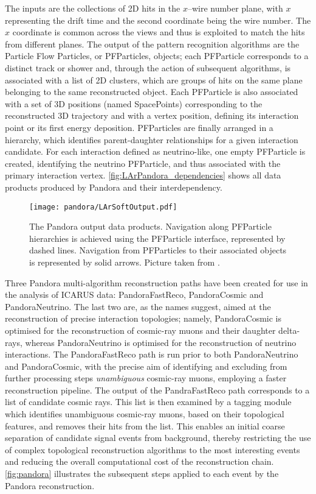 The inputs are the collections of 2D hits in the $x$--wire number plane, with $x$ representing the drift time and the second coordinate being the wire number. The $x$ coordinate is common across the views and thus is exploited to match the hits from different planes. The output of the pattern recognition algorithms are the Particle Flow Particles, or PFParticles, objects; each PFParticle corresponds to a distinct track or shower and, through the action of subsequent algorithms, is associated with a list of 2D clusters, which are groups of hits on the same plane belonging to the same reconstructed object. Each PFParticle is also associated with a set of 3D positions (named SpacePoints) corresponding to the reconstructed 3D trajectory and with a vertex position, defining its interaction point or its first energy deposition. PFParticles are finally arranged in a hierarchy, which identifies parent-daughter relationships for a given interaction candidate. For each interaction defined as neutrino-like, one empty PFParticle is created, identifying the neutrino PFParticle, and thus associated with the primary interaction vertex. \autoref{fig:LArPandora_dependencies} shows all data products produced by Pandora and their interdependency. 

\begin{figure}
    \centering
    \texttt{[image: pandora/LArSoftOutput.pdf]}
    \caption[LArPandora output data products]{The Pandora output data products. Navigation along PFParticle hierarchies is achieved using the PFParticle interface, represented by dashed lines. Navigation from PFParticles to their associated objects is represented by solid arrows. Picture taken from \cite{MicroBooNE:2017xvs}. }
    \label{fig:LArPandora_dependencies}
\end{figure}

Three Pandora multi-algorithm reconstruction paths have been created for use in the analysis of ICARUS data: PandoraFastReco, PandoraCosmic and PandoraNeutrino. The last two are, as the names suggest, aimed at the reconstruction of precise interaction topologies; namely,  PandoraCosmic is optimised for the reconstruction of cosmic-ray muons and their daughter delta-rays, whereas PandoraNeutrino is optimised for the reconstruction of neutrino interactions. The PandoraFastReco path is run prior to both PandoraNeutrino and PandoraCosmic, with the precise aim of identifying and excluding from further processing steps \emph{unambiguous} cosmic-ray muons, employing a faster reconstruction pipeline. The output of the PandraFastReco path corresponds to a list of candidate cosmic rays. This list is then examined by a tagging module which identifies unambiguous cosmic-ray muons, based on their topological features, and removes their hits from the list. This enables an initial coarse separation of candidate signal events from background, thereby restricting the use of complex topological reconstruction algorithms to the most interesting events and reducing the overall computational cost of the reconstruction chain. \autoref{fig:pandora} illustrates the subsequent steps applied to each event by the Pandora reconstruction. 

